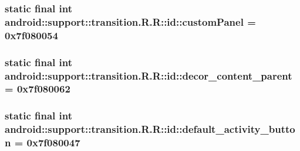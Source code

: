 \hypertarget{classandroid_1_1support_1_1transition_1_1_r_1_1id_629abe4c71dad0fef765b11f0ddb518b}{
\subsubsection[{customPanel}]{\setlength{\rightskip}{0pt plus 5cm}static final int android::support::transition.R.R::id::customPanel = 0x7f080054}}
\label{classandroid_1_1support_1_1transition_1_1_r_1_1id_629abe4c71dad0fef765b11f0ddb518b}


\hypertarget{classandroid_1_1support_1_1transition_1_1_r_1_1id_05b351f3560ec6f3f50ef37a90b2e9d7}{
\subsubsection[{decor\_\-content\_\-parent}]{\setlength{\rightskip}{0pt plus 5cm}static final int android::support::transition.R.R::id::decor\_\-content\_\-parent = 0x7f080062}}
\label{classandroid_1_1support_1_1transition_1_1_r_1_1id_05b351f3560ec6f3f50ef37a90b2e9d7}


\hypertarget{classandroid_1_1support_1_1transition_1_1_r_1_1id_1ad0020d305517df85c266dd6e576cf7}{
\subsubsection[{default\_\-activity\_\-button}]{\setlength{\rightskip}{0pt plus 5cm}static final int android::support::transition.R.R::id::default\_\-activity\_\-button = 0x7f080047}}
\label{classandroid_1_1support_1_1transition_1_1_r_1_1id_1ad0020d305517df85c266dd6e576cf7}


